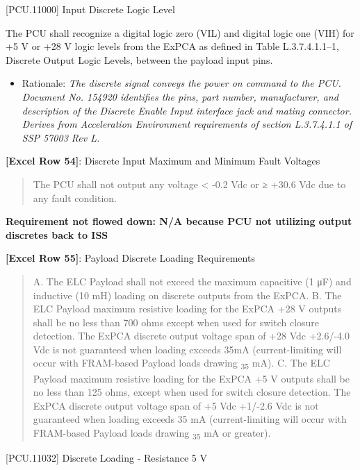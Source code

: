 [PCU.11000] Input Discrete Logic Level

The PCU shall recognize a digital logic zero (VIL) and digital logic one (VIH) for +5 V or +28 V  logic levels from the ExPCA as defined in Table L.3.7.4.1.1--1, Discrete Output Logic Levels, between the payload input pins.

\begin{itemize}
\item{} Rationale: \emph{The discrete signal conveys the power on command to the PCU. Document No. 154920 identifies the pins, part number, manufacturer, and description of the Discrete Enable Input interface jack and mating connector. Derives from Acceleration Environment requirements of section L.3.7.4.1.1 of SSP 57003 Rev L.}

\end{itemize}

\textbf{[Excel Row 54]}: Discrete Input Maximum and Minimum Fault Voltages

\begin{quote}
The PCU shall not output any voltage < -0.2 Vdc or ≥ +30.6 Vdc due to any fault condition.
\end{quote}

\textbf{Requirement not flowed down: N\slash A because PCU not utilizing output discretes back to ISS}

\textbf{[Excel Row 55]}: Payload Discrete Loading Requirements

\begin{quote}
A. The ELC Payload shall not exceed the maximum capacitive (1 μF) and inductive (10 mH) loading on discrete outputs from the ExPCA.
B. The ELC Payload maximum resistive loading for the ExPCA +28 V outputs shall be no less than 700 ohms except when used for switch closure detection. The ExPCA discrete output voltage span of +28 Vdc +2.6\slash -4.0 Vdc is not guaranteed when loading exceeds 35mA (current-limiting will occur with FRAM-based Payload loads drawing \textsubscript{35} mA).
C. The ELC Payload maximum resistive loading for the ExPCA +5 V outputs shall be no less than 125 ohms, except when used for switch closure detection. The ExPCA discrete output voltage span of +5 Vdc +1\slash -2.6 Vdc is not guaranteed when loading exceeds 35 mA (current-limiting will occur with FRAM-based Payload loads drawing \textsubscript{35} mA or greater).
\end{quote}

[PCU.11032] Discrete Loading - Resistance 5 V

